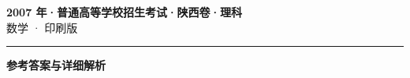 \documentclass[zihao=5, a4paper]{ctexart}
\begin{document}
\begin{center}
  {\Large\bfseries 2007 年·普通高等学校招生考试·陕西卷·理科}\\[4pt]
  {\large 数学 · 印刷版}
\end{center}
\medskip
{}

\par\bigskip\hrule\bigskip
{}
\begin{center}{\large\bfseries 参考答案与详细解析}\end{center}
\smallskip

\end{document}
